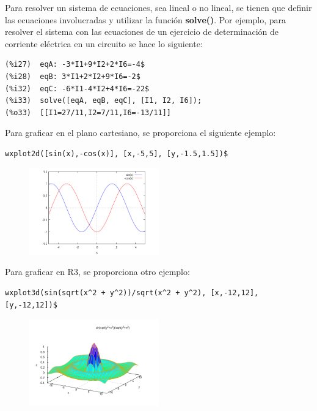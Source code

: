 \documentclass[a4paper]{article}
\begin{document}
Para resolver un sistema de ecuaciones, sea lineal o no lineal, se tienen que definir las ecuaciones involucradas y utilizar la función \textbf{solve()}. Por ejemplo, para resolver el sistema con las ecuaciones de un ejercicio de determinación de corriente eléctrica en un circuito se hace lo siguiente:

\begin{verbatim}
(%i27)	eqA: -3*I1+9*I2+2*I6=-4$
(%i28)	eqB: 3*I1+2*I2+9*I6=-2$
(%i32)	eqC: -6*I1-4*I2+4*I6=-22$
(%i33)	solve([eqA, eqB, eqC], [I1, I2, I6]);
(%o33)	[[I1=27/11,I2=7/11,I6=-13/11]]
\end{verbatim}

Para graficar en el plano cartesiano, se proporciona el siguiente ejemplo:

\begin{verbatim}
wxplot2d([sin(x),-cos(x)], [x,-5,5], [y,-1.5,1.5])$
\end{verbatim}


\begin{figure}[ht!]
\centering
\includegraphics[width=0.5\textwidth]{grafica2d.png}
\end{figure}


Para graficar en R3, se proporciona otro ejemplo:

\begin{verbatim}
wxplot3d(sin(sqrt(x^2 + y^2))/sqrt(x^2 + y^2), [x,-12,12], [y,-12,12])$
\end{verbatim}

\begin{figure}[ht!]
\centering
\includegraphics[width=0.5\textwidth]{grafica3d.png}
\end{figure}
\end{document}

